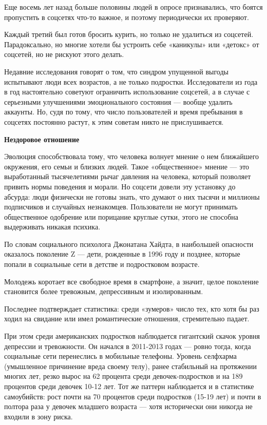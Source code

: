 Еще восемь лет назад больше половины людей в опросе признавались, что боятся пропустить в соцсетях что-то важное, и поэтому периодически их проверяют.

\begin{fancyquotes}
    Каждый третий был готов бросить курить, но только не удалиться из соцсетей. Парадоксально, но многие хотели бы устроить себе «каникулы» или «детокс» от соцсетей, но не рискуют этого делать.
\end{fancyquotes}

Недавние исследования говорят о том, что синдром упущенной выгоды испытывают люди всех возрастов, а не только подростки. Исследователи из года в год настоятельно советуют ограничить использование соцсетей, а в случае с серьезными улучшениями эмоционального состояния — вообще удалить аккаунты. Но, судя по тому, что число пользователей и время пребывания в соцсетях постоянно растут, к этим советам никто не прислушивается.

\textbf{Нездоровое отношение}

Эволюция способствовала тому, что человека волнует мнение о нем ближайшего окружения, его семьи и близких людей. Такое «общественное» мнение — это выработанный тысячелетиями рычаг давления на человека, который позволяет привить нормы поведения и морали. Но соцсети довели эту установку до абсурда: люди физически не готовы знать, что думают о них тысячи и миллионы подписчиков и случайных незнакомцев. Пользователи не могут принимать общественное одобрение или порицание круглые сутки, этого не способна выдерживать никакая психика.

По словам социального психолога Джонатана Хайдта, в наибольшей опасности оказалось поколение Z — дети, рожденные в 1996 году и позднее, которые попали в социальные сети в детстве и подростковом возрасте.

\begin{fancyquotes}
    Молодежь коротает все свободное время в смартфоне, а значит, целое поколение становится более тревожным, депрессивным и изолированным.
\end{fancyquotes}

Последнее подтверждает статистика: среди «зумеров» число тех, кто хотя бы раз ходил на свидание или имел романтические отношения, стремительно падает.

При этом среди американских подростков наблюдается гигантский скачок уровня депрессии и тревожности. Он начался в 2011-2013 годах — ровно тогда, когда социальные сети перенеслись в мобильные телефоны. Уровень селфхарма (умышленное причинение вреда своему телу), ранее стабильный на протяжении многих лет, резко вырос на 62 процента среди девочек-подростков и на 189 процентов среди девочек 10-12 лет. Тот же паттерн наблюдается и в статистике самоубийств: рост почти на 70 процентов среди подростков (15-19 лет) и почти в полтора раза у девочек младшего возраста — хотя исторически они никогда не входили в зону риска.


